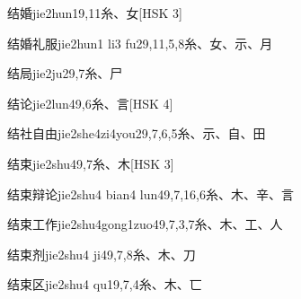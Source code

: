 \begin{EntryWithPhonetic}{结婚}{jie2hun1}{9,11}{⽷、⼥}[HSK 3]
\end{EntryWithPhonetic}

\begin{EntryWithPhonetic}{结婚礼服}{jie2hun1 li3 fu2}{9,11,5,8}{⽷、⼥、⽰、⽉}
\end{EntryWithPhonetic}

\begin{EntryWithPhonetic}{结局}{jie2ju2}{9,7}{⽷、⼫}
\end{EntryWithPhonetic}

\begin{EntryWithPhonetic}{结论}{jie2lun4}{9,6}{⽷、⾔}[HSK 4]
\end{EntryWithPhonetic}

\begin{EntryWithPhonetic}{结社自由}{jie2she4zi4you2}{9,7,6,5}{⽷、⽰、⾃、⽥}
\end{EntryWithPhonetic}

\begin{EntryWithPhonetic}{结束}{jie2shu4}{9,7}{⽷、⽊}[HSK 3]
\end{EntryWithPhonetic}

\begin{EntryWithPhonetic}{结束辩论}{jie2shu4 bian4 lun4}{9,7,16,6}{⽷、⽊、⾟、⾔}
\end{EntryWithPhonetic}

\begin{EntryWithPhonetic}{结束工作}{jie2shu4gong1zuo4}{9,7,3,7}{⽷、⽊、⼯、⼈}
\end{EntryWithPhonetic}

\begin{EntryWithPhonetic}{结束剂}{jie2shu4 ji4}{9,7,8}{⽷、⽊、⼑}
\end{EntryWithPhonetic}

\begin{EntryWithPhonetic}{结束区}{jie2shu4 qu1}{9,7,4}{⽷、⽊、⼖}
\end{EntryWithPhonetic}

